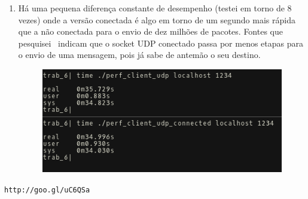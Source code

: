 \documentclass[11pt]{article}
\newcommand{\ttt}[1]{\texttt{#1}}
\begin{document}
\begin{enumerate}
\item Há uma pequena diferença constante de desempenho (testei em torno de 
	8 vezes) onde a versão conectada é algo em torno de um segundo mais rápida
	que a não conectada para o envio de dez milhões de pacotes. 
	Fontes que pesquisei~\cite{bokoharam} indicam que o socket UDP conectado
	passa por menos etapas para o envio de uma mensagem, pois já sabe de
	antemão o seu destino. 
	\begin{figure}[H]
		\centering
		\includegraphics[width=1.0\linewidth]{img/tcpdump4.png}
	\end{figure}
\end{enumerate}

\begin{thebibliography}{99}
		\ttt{http://goo.gl/uC6QSa}
\end{thebibliography}
\end{document}
